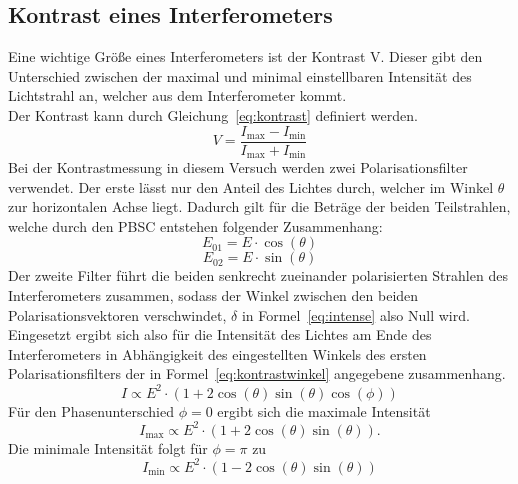 \subsection{Kontrast eines Interferometers}
%
Eine wichtige Größe eines Interferometers ist der Kontrast V. Dieser 
gibt den Unterschied zwischen der maximal und minimal 
einstellbaren Intensität des Lichtstrahl an, welcher aus 
dem Interferometer kommt.\\
Der Kontrast kann durch Gleichung~\eqref{eq:kontrast} 
definiert werden.
\begin{equation}
V = \frac{I_\text{max}-I_\text{min}}{I_\text{max}+I_\text{min}}
\label{eq:kontrast}
\end{equation}
Bei der Kontrastmessung in diesem Versuch werden zwei 
Polarisationsfilter verwendet. Der erste lässt nur den Anteil 
des Lichtes durch, welcher im Winkel $\theta$ zur 
horizontalen Achse liegt. 
Dadurch gilt für die Beträge der beiden Teilstrahlen, welche durch 
den PBSC entstehen folgender Zusammenhang:
\begin{equation*}
E_{01}=E\cdot\cos{(\theta)}
\end{equation*}
\begin{equation*}
E_{02}=E\cdot\sin{(\theta)}
\end{equation*}
Der zweite Filter führt die beiden senkrecht zueinander 
polarisierten Strahlen des 
Interferometers zusammen, sodass der Winkel zwischen den 
beiden Polarisationsvektoren verschwindet, $\delta$ in 
Formel~\eqref{eq:intense} also Null wird.\\
Eingesetzt ergibt sich also für die Intensität des Lichtes 
am Ende des Interferometers in Abhängigkeit des 
eingestellten Winkels des ersten Polarisationsfilters der in 
Formel~\eqref{eq:kontrastwinkel} angegebene zusammenhang.
\begin{equation}
I \propto E^2\cdot(1 + 2\cos{(\theta)}\sin{(\theta)}\cos{(\phi)})
\label{eq:kontrastwinkel}
\end{equation}
Für den Phasenunterschied $\phi = 0$ ergibt sich die maximale 
Intensität
\begin{equation}
  I_\text{max} \propto E^2\cdot(1 + 2\cos{(\theta)}\sin{(\theta)}).
  \label{eq:intens_max}
\end{equation}
Die minimale Intensität folgt für $\phi = \pi$ zu
\begin{equation}
  I_\text{min} \propto E^2\cdot(1 - 2\cos{(\theta)}\sin{(\theta)})
  \label{eq:intens_min}
\end{equation}
%
